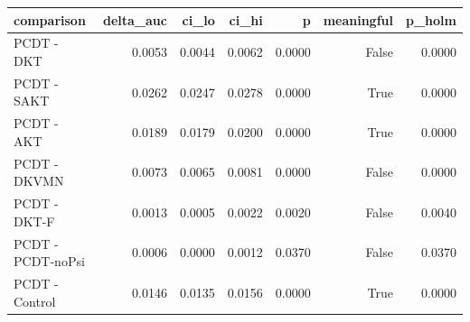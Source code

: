 \begin{tabular}{lrrrrrr}
\toprule
comparison & delta\_auc & ci\_lo & ci\_hi & p & meaningful & p\_holm \\
\midrule
PCDT - DKT & 0.0053 & 0.0044 & 0.0062 & 0.0000 & False & 0.0000 \\
PCDT - SAKT & 0.0262 & 0.0247 & 0.0278 & 0.0000 & True & 0.0000 \\
PCDT - AKT & 0.0189 & 0.0179 & 0.0200 & 0.0000 & True & 0.0000 \\
PCDT - DKVMN & 0.0073 & 0.0065 & 0.0081 & 0.0000 & False & 0.0000 \\
PCDT - DKT-F & 0.0013 & 0.0005 & 0.0022 & 0.0020 & False & 0.0040 \\
PCDT - PCDT-noPsi & 0.0006 & 0.0000 & 0.0012 & 0.0370 & False & 0.0370 \\
PCDT - Control & 0.0146 & 0.0135 & 0.0156 & 0.0000 & True & 0.0000 \\
\bottomrule
\end{tabular}
